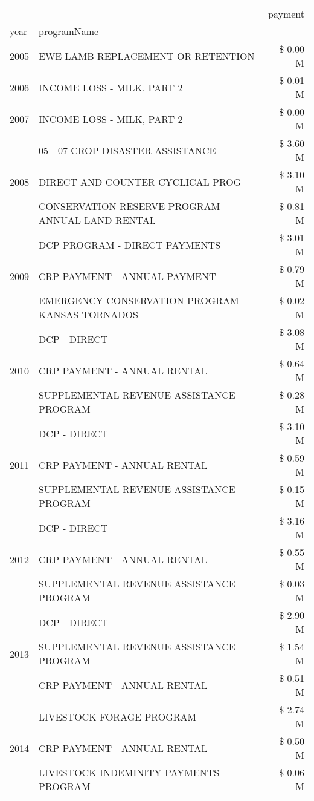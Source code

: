 \begin{tabular}{llr}
\toprule
 &  & payment \\
year & programName &  \\
\midrule
2005 & EWE LAMB REPLACEMENT OR RETENTION & \$ 0.00 M \\
\cline{1-3}
2006 & INCOME LOSS - MILK, PART 2 & \$ 0.01 M \\
\cline{1-3}
2007 & INCOME LOSS - MILK, PART 2 & \$ 0.00 M \\
\cline{1-3}
\multirow[t]{3}{*}{2008} & 05 - 07 CROP DISASTER ASSISTANCE & \$ 3.60 M \\
 & DIRECT AND COUNTER CYCLICAL PROG & \$ 3.10 M \\
 & CONSERVATION RESERVE PROGRAM - ANNUAL LAND RENTAL & \$ 0.81 M \\
\cline{1-3}
\multirow[t]{3}{*}{2009} & DCP PROGRAM - DIRECT PAYMENTS & \$ 3.01 M \\
 & CRP PAYMENT - ANNUAL PAYMENT & \$ 0.79 M \\
 & EMERGENCY CONSERVATION PROGRAM - KANSAS TORNADOS & \$ 0.02 M \\
\cline{1-3}
\multirow[t]{3}{*}{2010} & DCP - DIRECT & \$ 3.08 M \\
 & CRP PAYMENT - ANNUAL RENTAL & \$ 0.64 M \\
 & SUPPLEMENTAL REVENUE ASSISTANCE PROGRAM & \$ 0.28 M \\
\cline{1-3}
\multirow[t]{3}{*}{2011} & DCP - DIRECT & \$ 3.10 M \\
 & CRP PAYMENT - ANNUAL RENTAL & \$ 0.59 M \\
 & SUPPLEMENTAL REVENUE ASSISTANCE PROGRAM & \$ 0.15 M \\
\cline{1-3}
\multirow[t]{3}{*}{2012} & DCP - DIRECT & \$ 3.16 M \\
 & CRP PAYMENT - ANNUAL RENTAL & \$ 0.55 M \\
 & SUPPLEMENTAL REVENUE ASSISTANCE PROGRAM & \$ 0.03 M \\
\cline{1-3}
\multirow[t]{3}{*}{2013} & DCP - DIRECT & \$ 2.90 M \\
 & SUPPLEMENTAL REVENUE ASSISTANCE PROGRAM & \$ 1.54 M \\
 & CRP PAYMENT - ANNUAL RENTAL & \$ 0.51 M \\
\cline{1-3}
\multirow[t]{3}{*}{2014} & LIVESTOCK FORAGE PROGRAM & \$ 2.74 M \\
 & CRP PAYMENT - ANNUAL RENTAL & \$ 0.50 M \\
 & LIVESTOCK INDEMINITY PAYMENTS PROGRAM & \$ 0.06 M \\

\end{tabular}
